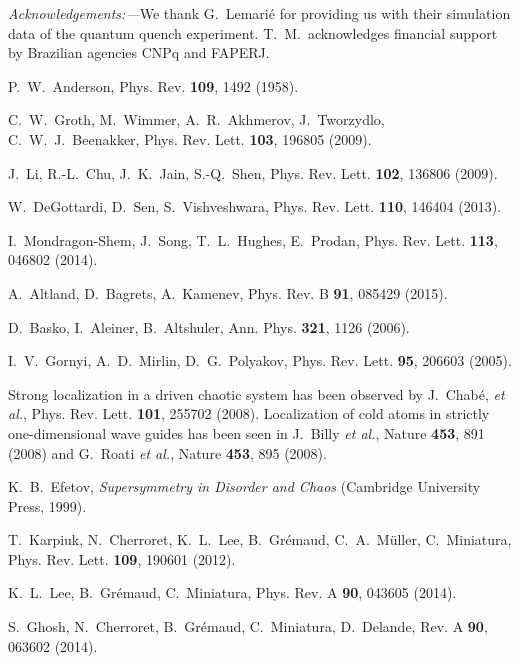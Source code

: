 \documentclass[twocolumn,showpacs,aps,prl]{revtex4}
\begin{document}
{\it Acknowledgements:---}We thank G.~Lemari\'e for providing us with their simulation 
data of the quantum quench experiment. 
T.~M.~acknowledges financial support by Brazilian agencies CNPq and FAPERJ. 












\begin{thebibliography}{99}

P.~W.~Anderson, Phys. Rev. {\bf 109}, 1492 (1958).

C.~W.~Groth, M.~Wimmer, A.~R.~Akhmerov, J.~Tworzydlo, C.~W.~J.~Beenakker, 
Phys. Rev. Lett. {\bf 103}, 196805 (2009).

J.~Li, R.-L.~Chu, J.~K.~Jain, S.-Q.~Shen, Phys. Rev. Lett. {\bf 102}, 136806 (2009).

W.~DeGottardi, D.~Sen, S.~Vishveshwara, Phys. Rev. Lett. {\bf 110}, 146404 (2013).

I.~Mondragon-Shem, J.~Song, T.~L.~Hughes, E.~Prodan, Phys. Rev. Lett. {\bf 113}, 046802 (2014).

A.~Altland, D.~Bagrets, A.~Kamenev, Phys. Rev. B {\bf 91}, 085429 (2015).

D.~Basko, I.~Aleiner, B.~Altshuler, Ann. Phys. {\bf 321}, 1126 (2006).

I.~V.~Gornyi, A.~D.~Mirlin, D.~G.~Polyakov, Phys. Rev. Lett. {\bf 95}, 206603 (2005).

Strong localization in a driven chaotic 
system has been observed by J.~Chab\'e, {\it et al.}, Phys. Rev. Lett. {\bf 101}, 255702 (2008). 
Localization of cold atoms in strictly one-dimensional wave guides has been seen in
J.~Billy  {\it et al.}, Nature {\bf 453}, 891 (2008) and G.~Roati {\it et al.}, Nature \textbf{453}, 895 (2008). 

K.~B.~Efetov, \textit{Supersymmetry in Disorder and Chaos} (Cambridge University Press, 1999). 

T.~Karpiuk, N.~Cherroret, K.~L.~Lee, B.~Gr\'emaud, C.~A.~M\"uller, C.~Miniatura,
 Phys. Rev. Lett. {\bf 109}, 190601 (2012).

K.~L.~Lee, B.~Gr\'emaud, C.~Miniatura, 
Phys. Rev. A {\bf 90}, 043605 (2014).

S.~Ghosh, N.~Cherroret, B.~Gr\'emaud, C.~Miniatura, D.~Delande,
Rev. A {\bf 90}, 063602 (2014).


\end{thebibliography}
\end{document}
